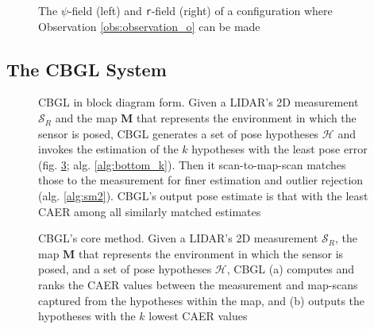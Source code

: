 \begin{figure}
  
  \vspace{0.7cm}
  \caption{\small The $\psi$-field (left) and \texttt{r}-field (right) of a
           configuration where Observation \ref{obs:observation_o} can be made}
  \label{fig:h_fig1}
\end{figure}


\subsection{The CBGL System}




\begin{figure}[]\centering
  
  \caption{\small CBGL in block diagram form. Given a LIDAR's 2D measurement
           $\mathcal{S}_R$ and the map $\bm{M}$ that represents the environment
           in which the sensor is posed, CBGL generates a set of pose hypotheses
           $\mathcal{H}$ and invokes the estimation of the $k$ hypotheses with
           the least pose error (fig. \ref{fig:bottom_k}; alg.
           \ref{alg:bottom_k}). Then it scan-to-map-scan matches those to the
           measurement for finer estimation and outlier rejection (alg.
           \ref{alg:sm2}). CBGL's output pose estimate is that with the least
           CAER among all similarly matched estimates}
  \label{fig:cbgl}
\end{figure}

\begin{figure}[]\centering
  
  \caption{\small CBGL's core method. Given a LIDAR's 2D measurement
           $\mathcal{S}_R$, the map $\bm{M}$ that represents the environment in
           which the sensor is posed, and a set of pose hypotheses
           $\mathcal{H}$, CBGL (a) computes and ranks the CAER values between
           the measurement and map-scans captured from the hypotheses within
           the map, and (b) outputs the hypotheses with the $k$ lowest CAER
           values}
  \label{fig:bottom_k}
\end{figure}





